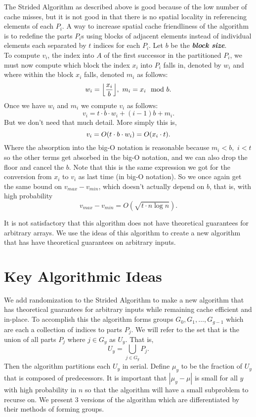 \documentclass[twocolumn, twoside, 11pt]{article}
\DeclarePairedDelimiter{\floor}{\lfloor}{\rfloor}
\DeclarePairedDelimiter{\paren}{(}{)}
\newcommand{\defn}[1]       {{\textit{\textbf{\boldmath #1}}}}
\renewcommand{\paragraph}[1]{\vspace{0.09in}\noindent{\bf \boldmath #1.}}
\begin{document}
\paragraph{Spatial locality}
The Strided Algorithm as described above is good because of the low number of cache misses, but it is not good in that there is no spatial locality in referencing elements of each $P_i$.
A way to increase spatial cache friendliness of the algorithm is to redefine the parts $P_i$s using blocks of adjacent elements instead of individual elements each separated by $t$ indices for each $P_i$.
Let $b$ be the \defn{block size}. \\
To compute $v_i$, the index into $A$ of the first successor in the partitioned $P_i$, we must now compute which block the index $x_i$ into $P_i$ falls in, denoted by $w_i$ and where within the block $x_i$ falls, denoted $m_i$ as follows:
$$w_i = \floor*{ \frac{x_i}{b} },\,\, m_i=x_i \mod b.$$
Once we have $w_i$ and $m_i$ we compute $v_i$ as follows:
$$v_i = t\cdot b\cdot w_i + (i-1)b+m_i.$$
But we don't need that much detail.
More simply this is, 
$$v_i = O(t\cdot b \cdot w_i) = O\paren*{x_i\cdot t}.$$
Where the absorption into the big-O notation is reasonable because $m_i < b,\,\, i<t$ so the other terms get absorbed in the big-O notation, and we can also drop the floor and cancel the $b$. 
Note that this is the same expression we got for the conversion from $x_i$ to $v_i$ as last time (in big-O notation).
So we once again get the same bound on $v_{max}-v_{min}$, which doesn't actually depend on $b$, that is, with high probability
$$v_{max}-v_{min} = O(\sqrt{t\cdot n\log n}).$$

\paragraph{Summary}
It is not satisfactory that this algorithm does not have theoretical guarantees for arbitrary arrays. 
We use the ideas of this algorithm to create a new algorithm that has have theoretical guarantees on arbitrary inputs.


\section{Key Algorithmic Ideas}
We add randomization to the Strided Algorithm to make a new algorithm that has theoretical guarantees for arbitrary inputs while remaining cache efficient and in-place.
To accomplish this the algorithm forms groups $G_0,G_1,\ldots,G_{g-1}$ which are each a collection of indices to parts $P_j$. 
We will refer to the set that is the union of all parts $P_j$ where $j \in G_y$ as $U_y$. That is,
$$U_y = \bigcup_{j\in G_y}P_j.$$
Then the algorithm partitions each $U_y$ in serial.
Define $\mu_y$ to be the fraction of $U_y$ that is composed of predecessors.
It is important that $|\mu_y - \mu|$ is small for all $y$ with high probability in $n$ so that the algorithm will have a small subproblem to recurse on.
We present 3 versions of the algorithm which are differentiated by their methods of forming groups.
\end{document}
